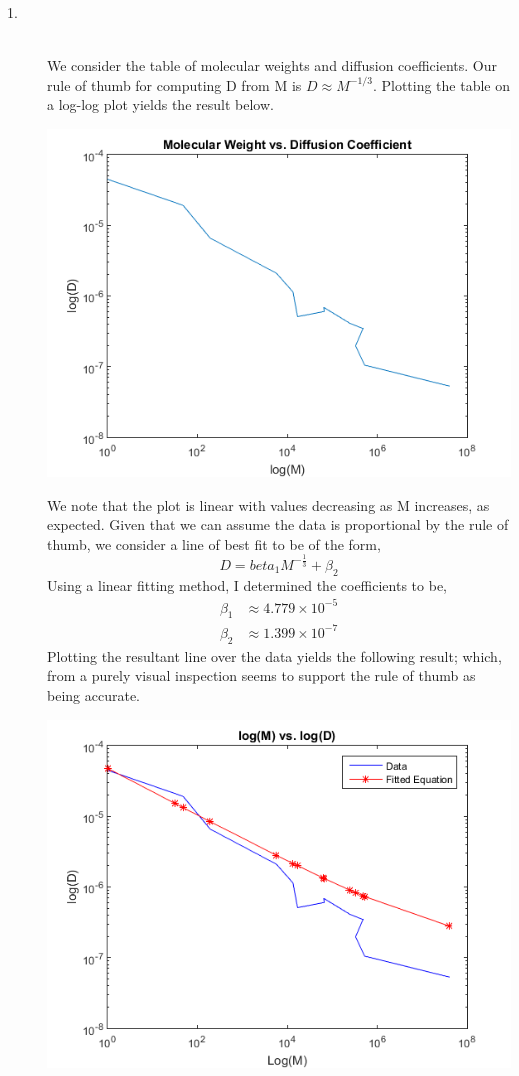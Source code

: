\documentclass[letterpaper,10pt]{article}
\begin{document}
\begin{description}
\item[1.]\hfill \\
We consider the table of molecular weights and diffusion coefficients. Our rule of thumb for computing D from M is $D\approx M^{-1/3}$. Plotting the table on a log-log plot yields the result below.
\begin{center}
\includegraphics{pureplot.png}
\end{center}
We note that the plot is linear with values decreasing as M increases, as expected. Given that we can assume the data is proportional by the rule of thumb, we consider a line of best fit to be of the form,
\[D=beta_1M^{-\frac{1}{3}}+\beta_2\]
Using a linear fitting method, I determined the coefficients to be,
\begin{align*}
\beta_1 &\approx 4.779\times 10^{-5}\\
\beta_2 &\approx 1.399\times 10^{-7}
\end{align*}
Plotting the resultant line over the data yields the following result; which, from a purely visual inspection seems to support the rule of thumb as being accurate.
\begin{center}
\includegraphics{bestfit.png}

\end{center}
\end{description}
\end{document}
